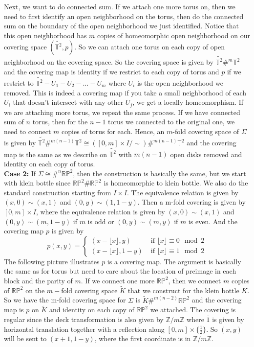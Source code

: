 \documentclass[12pt]{amsart}
\newcommand{\Z}{\mathbb{Z}}
\newcommand{\torus}{\mathbb{T}^2}
\newcommand{\rp}{\mathbb{RP}^2}
\begin{document}
Next, we want to do connected sum. If we attach one more torus on, then we need to first identify an open neighborhood on the torus, then do the connected sum on the boundary of the open neighborhood we just identified. Notice that this open neighborhood has $m$ copies of homeomorphic open neighborhood on our covering space $(\tilde{\torus},p)$. So we can attach one torus on each copy of open neighborhood on the covering space. So the covering space is given by $\tilde{\torus}\#^m \torus$ and the covering map is identity if we restrict to each copy of torus and $p$ if we restrict to $\tilde{\torus}-U_1-U_2-\dots-U_m$ where $U_i$ is the open neighborhood we removed. This is indeed a covering map if you take a small neighborhood of each $U_i$ that doesn't intersect with any other $U_j$, we get a locally homeomorphism. If we are attaching more torus, we repeat the same process. If we have connected sum of $n$ torus, then for the $n-1$ torus we connected to the original one, we need to connect $m$ copies of torus for each. Hence, an $m$-fold covering space of $\Sigma$ is given by $\tilde{\torus}\#^{m(n-1)}\torus\cong ([0,m]\times I/\sim)\#^{m(n-1)}\torus$ and the covering map is the same as we describe on $\tilde{\torus}$ with $m(n-1)$ open disks removed and identity on each copy of torus.\\
\textbf{Case 2:} If $\Sigma\cong \#^n\rp $, then the construction is basically the same, but we start with klein bottle since $\rp\#\rp$ is homeomorphic to klein bottle. We also do the standard construction starting from $I\times I$. The equivalence relation is given by $(x,0)\sim(x,1)$ and $(0,y)\sim(1,1-y)$. Then a m-fold covering is given by $[0,m]\times I$, where the equivalence relation is given by $(x,0)\sim(x,1)$ and $(0,y)\sim(m,1-y)$ if $m$ is odd or $(0,y)\sim (m,y)$ if $m$ is even. And the covering map $p$ is given by 
\[p(x,y)=\begin{cases}
    (x-\lfloor x\rfloor,y) & \text{ if } \lfloor x\rfloor\equiv 0 \mod {2}\\
    (x-\lfloor x\rfloor,1-y) & \text{ if } \lfloor x\rfloor\equiv 1 \mod {2}
\end{cases}\]
The following picture illustrates $p$ is a covering map. The argument is basically the same as for torus but need to care about the location of preimage in each block and the parity of $m$. If we connect one more $\rp$, then we connect $m$ copies of $\rp$ on the $m-$fold covering space $\tilde{K}$ that we construct for the klein bottle $K$. So we have the m-fold covering space for $\Sigma$ is $\tilde{K}\#^{m(n-2)}\rp$ and the covering map is $p$ on $\tilde{K}$ and identity on each copy of $\rp$ we attached. The covering is regular since the deck transformation is also given by $\Z/m\Z$ where $\bar{1}$ is given by horizontal translation together with a reflection along $[0,m]\times \{\frac{1}{2}\}$. So $(x,y)$ will be sent to $(x+1,1-y)$, where the first coordinate is in $\Z/m\Z$.\\
\end{document}
